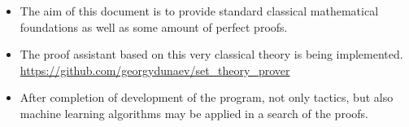 


\begin{itemize}
\item The aim of this document is to provide standard classical mathematical foundations as well as some amount of perfect proofs.
\item The proof assistant based on this very classical theory is being implemented. \url{https://github.com/georgydunaev/set_theory_prover}
\item After completion of development of the program, not only tactics, but also machine learning algorithms may be applied in a search of the proofs.

\end{itemize}
\newpage




















\\
